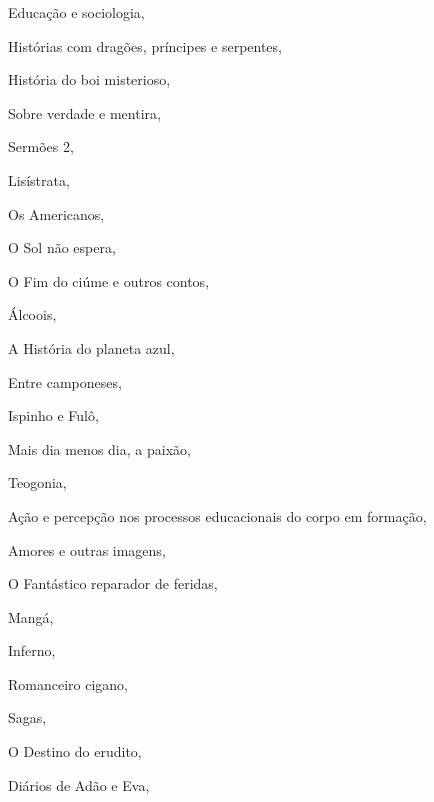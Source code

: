 \begin{multicols}{2}
\begin{enumerate}
{\item Educação e sociologia, {}
\item Histórias com dragões, príncipes e serpentes, {}
\item História do boi misterioso, {}
\item Sobre verdade e mentira, {}
\item Sermões 2, {}
\item Lisístrata, {}
\item Os Americanos, {}
\item O Sol não espera, {}
\item O Fim do ciúme e outros contos, {}
\item Álcoois, {}
\item A História do planeta azul, {}
\item Entre camponeses, {}
\item Ispinho e Fulô, {}
\item Mais dia menos dia, a paixão, {}
\item Teogonia, {}
\item Ação e percepção nos processos educacionais do corpo em formação, {}
\item Amores e outras imagens, {}
\item O Fantástico reparador de feridas, {}
\item Mangá, {}
\item Inferno, {}
\item Romanceiro cigano, {}
\item Sagas, {}
\item O Destino do erudito, {}
\item Diários de Adão e Eva, {}
}
\end{enumerate}
\end{multicols}
